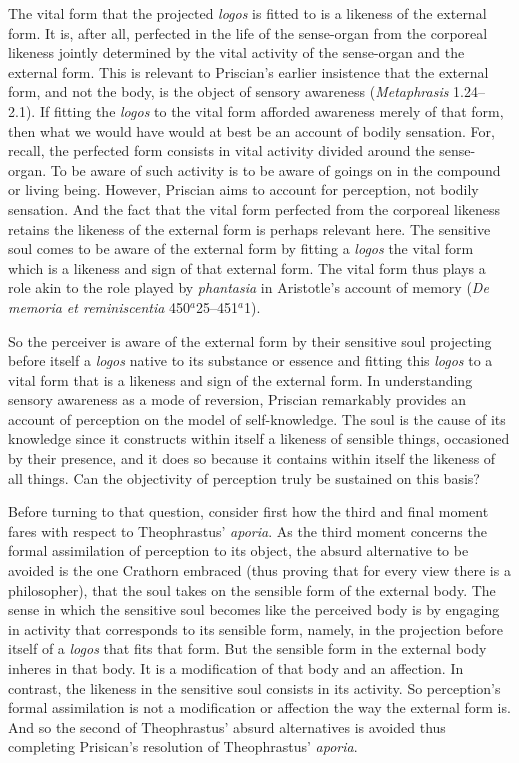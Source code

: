 \documentclass[12pt]{article}
\begin{document}
The vital form that the projected \emph{logos} is fitted to is a likeness of the external form. It is, after all, perfected in the life of the sense-organ from the corporeal likeness jointly determined by the vital activity of the sense-organ and the external form. This is relevant to Priscian's earlier insistence that the external form, and not the body, is the object of sensory awareness (\emph{Metaphrasis} 1.24--2.1). If fitting the \emph{logos} to the vital form afforded awareness merely of that form, then what we would have would at best be an account of bodily sensation. For, recall, the perfected form consists in vital activity divided around the sense-organ. To be aware of such activity is to be aware of goings on in the compound or living being. However, Priscian aims to account for perception, not bodily sensation. And the fact that the vital form perfected from the corporeal likeness retains the likeness of the external form is perhaps relevant here. The sensitive soul comes to be aware of the external form by fitting a \emph{logos} the vital form which is a likeness and sign of that external form. The vital form thus plays a role akin to the role played by \emph{phantasia} in Aristotle's account of memory (\emph{De memoria et reminiscentia} 450\( ^{a} \)25–451\( ^{a} \)1).

So the perceiver is aware of the external form by their sensitive soul projecting before itself a \emph{logos} native to its substance or essence and fitting this \emph{logos} to a vital form that is a likeness and sign of the external form. In understanding sensory awareness as a mode of reversion, Priscian remarkably provides an account of perception on the model of self-knowledge. The soul is the cause of its knowledge since it constructs within itself a likeness of sensible things, occasioned by their presence, and it does so because it contains within itself the likeness of all things. Can the objectivity of perception truly be sustained on this basis?

Before turning to that question, consider first how the third and final moment fares with respect to Theophrastus' \emph{aporia}. As the third moment concerns the formal assimilation of perception to its object, the absurd alternative to be avoided is the one Crathorn embraced (thus proving that for every view there is a philosopher), that the soul takes on the sensible form of the external body. The sense in which the sensitive soul becomes like the perceived body is by engaging in activity that corresponds to its sensible form, namely, in the projection before itself of a \emph{logos} that fits that form. But the sensible form in the external body inheres in that body. It is a modification of that body and an affection. In contrast, the likeness in the sensitive soul consists in its activity. So perception's formal assimilation is not a modification or affection the way the external form is. And so the second of Theophrastus' absurd alternatives is avoided thus completing Prisican's resolution of Theophrastus' \emph{aporia}.
\end{document}
